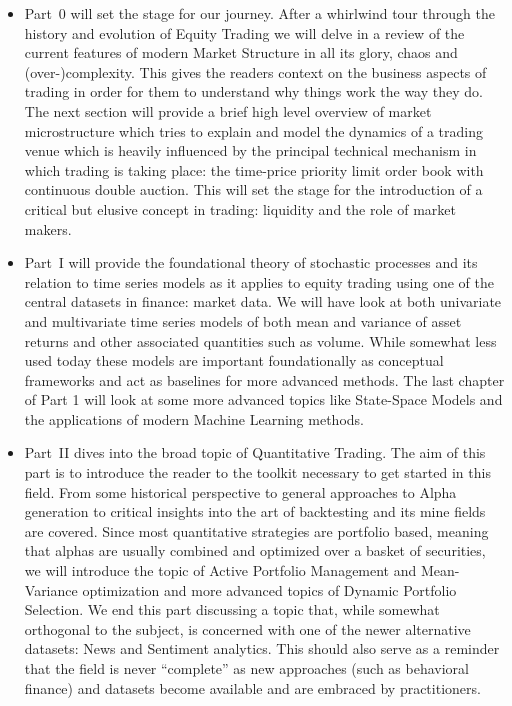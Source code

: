 \begin{itemize}
\item Part~0 will set the stage for our journey. After a whirlwind tour through the history and evolution of Equity Trading we will delve in a review of the current features of modern Market Structure in all its glory, chaos and (over-)complexity. This gives the readers context on the business aspects of trading in order for them to understand why things work the way they do. The next section will provide a brief high level overview of market microstructure which tries to explain and model the dynamics of a trading venue which is heavily influenced by the principal technical mechanism in which trading is taking place: the time-price priority limit order book with  continuous double auction. This will set the stage for the introduction of a critical but elusive concept in trading: liquidity and the role of market makers.

\item Part~I will provide the foundational theory of stochastic processes and its relation to time series models as it applies to equity trading using one of the central datasets in finance: market data. We will have look at both univariate and multivariate time series models of both mean and variance of asset returns and other associated quantities such as volume. While somewhat less used today these models are important foundationally as conceptual frameworks and act as baselines for more advanced methods. The last chapter of Part 1 will look at some more advanced topics like State-Space Models and the applications of modern Machine Learning methods.

\item Part~II dives into the broad topic of Quantitative Trading. The aim of this part is to introduce the reader to the toolkit necessary to get started in this field. From some historical perspective to general approaches to Alpha generation to critical insights into the art of backtesting and its mine fields are covered. Since most quantitative strategies are portfolio based, meaning that alphas are usually  combined  and optimized over a basket of securities, we will introduce the topic of Active Portfolio Management and Mean-Variance optimization and more advanced topics of Dynamic Portfolio Selection. We end this part discussing a topic that, while somewhat orthogonal to the subject, is concerned with one of the newer alternative datasets: News and Sentiment analytics. This should also serve as a reminder that the field is never ``complete'' as new approaches (such as behavioral finance) and datasets become available and are embraced by practitioners.


\end{itemize}
